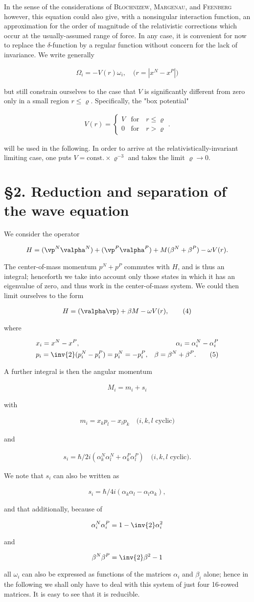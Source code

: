 \documentclass{article}
\newcommand{\nequ}[2]{
\begin{align*}
#1
\tag{#2}
\end{align*}
}
\newcommand{\uequ}[1]{
\begin{align*}
#1
\end{align*}
}
\begin{document}
In the sense of the considerations of \textsc{Blochnizew}, \textsc{Margenau}, and \textsc{Feenberg}\cite{1} however, this equation could also give, with a nonsingular interaction function, an approximation for the order of magnitude of the relativistic corrections which occur at the usually-assumed range of force. In any case, it is convenient for now to replace the $\delta$-function by a regular function without concern for the lack of invariance. We write generally
\uequ{
\Omega_i = -V(r)\omega_i,\quad\text{($r=|x^N-x^P|$)}
}
but still constrain ourselves to the case that $V$ is significantly different from zero only in a small region $r \leq \varrho$. Specifically, the "box potential"
\nequ{
V(r) = \begin{cases}
 V & \text{for}\quad r \leq \varrho\\
 0 & \text{for}\quad r > \varrho
 \end{cases}.
}{3}
will be used in the following. In order to arrive at the relativistically-invariant limiting case, one puts $V=\text{const.}\times\varrho^{-3}$ and takes the limit $\varrho \to 0$.

\section*{§2. Reduction and separation of the wave equation}

We consider the operator
\uequ{
H = (\vp^N\valpha^N) + (\vp^P\valpha^P) + M(\beta^N + \beta^P) - \omega V(r).
}

The center-of-mass momentum $p^N+p^P$ commutes with $H$, and is thus an integral; henceforth we take into account only those states in which it has an eigenvalue of zero, and thus work in the center-of-mass system. We could then limit ourselves to the form
\nequ{
H = (\valpha\vp) + \beta M - \omega V(r),
}{4}
where
\nequ{
&x_i = x^N - x^P, &\alpha_i = \alpha^N_i - \alpha^P_i\\
&p_i = \inv{2}(p^N_i - p^P_i) = p^N_i = -p^P_i,  &\beta = \beta^N + \beta^P.
}{5}
A further integral is then the angular momentum
\uequ{
M_i = m_i + s_i
}
with
\uequ{
m_i = x_k p_l - x_l p_k \quad \text{($i,k,l$ cyclic)}
}
and
\uequ{
s_i = \hbar/2 i (\alpha^N_k \alpha^N_l + \alpha^P_k \alpha^P_l) \quad \text{($i,k,l$ cyclic)}.
}

We note that $s_i$ can also be written as
\uequ{
s_i = \hbar/4 i (\alpha_k \alpha_l - \alpha_l \alpha_k),
}
and that additionally, because of
\uequ{
\alpha^N_i \alpha^P_i = 1 - \inv{2}\alpha^2_i
}
and
\uequ{
\beta^N \beta^P = \inv{2}\beta^2 - 1
}
all $\omega_i$ can also be expressed as functions of the matrices $\alpha_i$ and $\beta_i$ alone; hence in the following we shall only have to deal with this system of just four 16-rowed matrices. It is easy to see that it is reducible.
\end{document}

